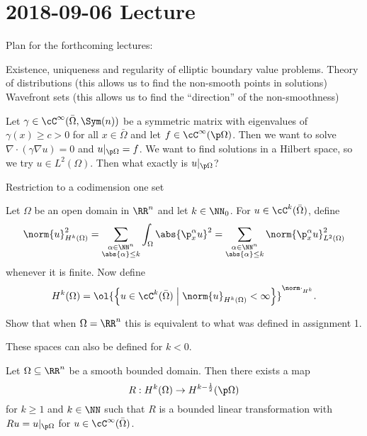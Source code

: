 \section{2018-09-06 Lecture}

Plan for the forthcoming lectures:

\begin{itm}
  \io Existence, uniqueness and regularity of elliptic boundary value problems.
  \io Theory of distributions (this allows us to find the non-smooth points in solutions)
  \io Wavefront sets (this allows us to find the ``direction'' of the non-smoothness)
\end{itm}

Let $\gamma\in\cC^\infty(\bar\Omega,\Sym(n))$ be a symmetric matrix with eigenvalues of $\gamma(x)\geq c>0$ for all $x\in\bar\Omega$ and let $f\in\cC^\infty(\p\Omega)$.
Then we want to solve $\nabla\cdot(\gamma\nabla u)=0$ and $u|_{\p\Omega}=f$.
We want to find solutions in a Hilbert space, so we try $u\in L^2(\Omega)$.
Then what exactly is $u|_{\p\Omega}$?

Restriction to a codimension one set

\begin{defn}
  Let $\Omega$ be an open domain in $\RR^n$ and let $k\in\NN_0$.
  For $u\in\cC^k(\bar\Omega)$, define
  \[ \norm{u}_{H^k(\Omega)}^2 = \sum_{\substack{\alpha\in\NN^n\\\abs{\alpha}\leq k}} \int_\Omega \abs{\p_x^\alpha u}^2 = \sum_{\substack{\alpha\in\NN^n\\\abs{\alpha}\leq k}} \norm{\p_x^\alpha u}_{L^2(\Omega)}^2 \]
  whenever it is finite.
  Now define
  \[ H^k(\Omega) = \ol{ \left\{ u\in\cC^k(\bar\Omega) \; \Big\vert \; \norm{u}_{H^k(\Omega)}<\infty \right\}}^{\norm\cdot_{H^k}}. \]
\end{defn}

\begin{exer}
  Show that when $\Omega=\RR^n$ this is equivalent to what was defined in assignment 1.
\end{exer}

\begin{rmk}
  These spaces can also be defined for $k<0$.
\end{rmk}

\begin{thm}\label{11:boundary}
  Let $\Omega\subseteq\RR^n$ be a smooth bounded domain.
  Then there exists a map
  \[ R: H^k(\Omega) \to H^{k-\frac12}(\p\Omega) \]
  for $k\geq 1$ and $k\in\NN$ such that $R$ is a bounded linear transformation with $Ru=u|_{\p\Omega}$ for $u\in\cC^\infty(\bar\Omega)$.
\end{thm}

